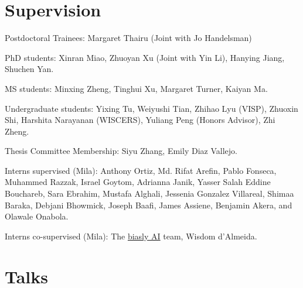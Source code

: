 \documentclass[letterpaper]{article}
\renewenvironment{itemize}{
  \begin{list}{}{
    \setlength{\leftmargin}{1.5em}
  }
}{
  \end{list}
}
\begin{document}
\section*{Supervision}
\begin{itemize}
\item Postdoctoral Trainees: Margaret Thairu (Joint with Jo Handelsman)
\item PhD students: Xinran Miao, Zhuoyan Xu (Joint with Yin Li), Hanying Jiang,
Shuchen Yan.
\item MS students: Minxing Zheng, Tinghui Xu, Margaret Turner, Kaiyan Ma.
\item Undergraduate students: Yixing Tu, Weiyushi Tian, Zhihao Lyu (VISP),
  Zhuoxin Shi, Harshita Narayanan (WISCERS), Yuliang Peng (Honors Advisor), Zhi
  Zheng.
\item Thesis Committee Membership: Siyu Zhang, Emily Diaz Vallejo.
\item Interns supervised (Mila): Anthony Ortiz, Md. Rifat Arefin, Pablo Fonseca,
  Muhammed Razzak, Israel Goytom, Adrianna Janik, Yasser Salah Eddine Bouchareb,
  Sara Ebrahim, Mustafa Alghali, Jessenia Gonzalez Villareal, Shimaa Baraka,
  Debjani Bhowmick, Joseph Baafi, James Assiene, Benjamin Akera, and Olawale
  Onabola.
\item Interns co-supervised (Mila): The
\href{https://sites.google.com/view/biaslyai/home}{biasly AI} team, Wisdom
d'Almeida.
\end{itemize}

\section*{Talks}
\end{document}
